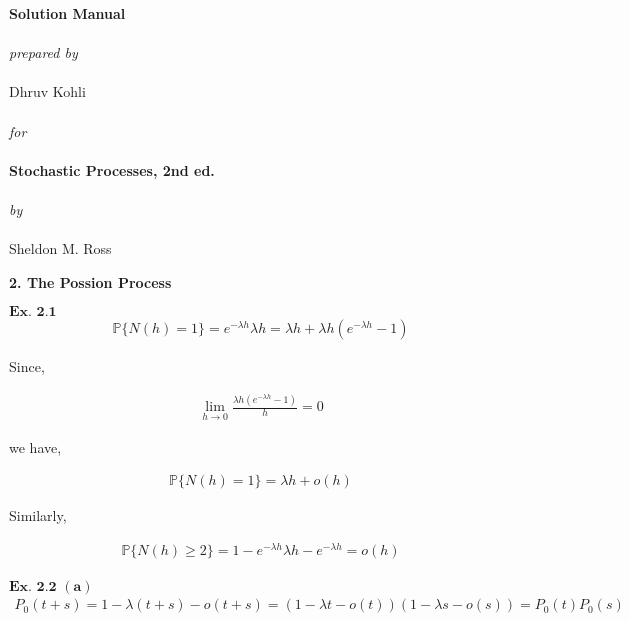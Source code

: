 \documentclass{article}
\begin{document}
\raggedright


\begin{center}
    \textbf{\Large{Solution Manual}}\\~\\
    \textit{prepared by}\\~\\
    Dhruv Kohli\\~\\
    \textit{for}\\~\\
    \textbf{\Large{Stochastic Processes, 2nd ed.}}\\~\\
    \textit{by}\\~\\
    \large{Sheldon M. Ross}~\\
\end{center}
\clearpage

\begin{center}
    \textbf{\large{2. The Possion Process}}
\end{center}

${\textbf{Ex. 2.1}}$
\begin{align*}
\mathbb{P}\{N(h)=1\} = e^{-\lambda h}\lambda h = \lambda h + \lambda h(e^{-\lambda h}-1)
\end{align*}

Since,

\begin{align*}
\lim_{h \rightarrow 0} \frac{\lambda h (e^{-\lambda h}-1)}{h} = 0
\end{align*}

we have,

\begin{align*}
\mathbb{P}\{N(h)=1\} = \lambda h + o(h)
\end{align*}

Similarly,

\begin{align*}
\mathbb{P}\{N(h)\geq 2\} = 1-e^{-\lambda h}\lambda h - e^{-\lambda h} = o(h)
\end{align*}

\vspace{0.2in}

${\textbf{Ex. 2.2}}$
$\mathbf{(a)}$
\begin{align*}
P_{0}(t+s) = 1- \lambda (t+s) - o(t+s) = (1-\lambda t-o(t))(1-\lambda s - o(s)) = P_{0}(t)P_{0}(s)
\end{align*}
\end{document}
